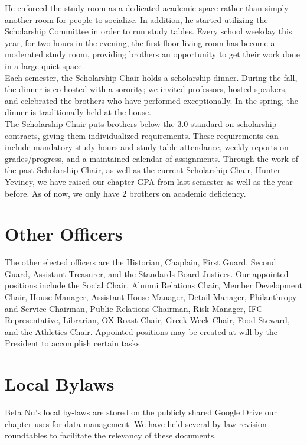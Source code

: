 	He enforced the study room as a dedicated academic space rather than simply another room for people to socialize. In addition, he started utilizing the Scholarship Committee in order to run study tables. Every school weekday this year, for two hours in the evening, the first floor living room has become a moderated study room, providing brothers an opportunity to get their work done in a large quiet space. \\

	Each semester, the Scholarship Chair holds a scholarship dinner. During the fall, the dinner is co-hosted with a sorority; we invited professors, hosted speakers, and celebrated the brothers who have performed exceptionally. In the spring, the dinner is traditionally held at the house. \\

	The Scholarship Chair puts brothers below the 3.0 standard on scholarship contracts, giving them individualized requirements. These requirements can include mandatory study hours and study table attendance, weekly reports on grades/progress, and a maintained calendar of assignments. Through the work of the past Scholarship Chair, as well as the current Scholarship Chair, Hunter Yevincy, we have raised our chapter GPA from last semester as well as the year before. As of now, we only have 2 brothers on academic deficiency. 
	
    \section*{Other Officers}
	The other elected officers are the Historian, Chaplain, First Guard, Second Guard, Assistant Treasurer, and the Standards Board Justices. Our appointed positions include the Social Chair, Alumni Relations Chair, Member Development Chair, House Manager, Assistant House Manager, Detail Manager, Philanthropy and Service Chairman, Public Relations Chairman, Risk Manager, IFC Representative, Librarian, OX Roast Chair, Greek Week Chair, Food Steward, and the Athletics Chair. Appointed positions may be created at will by the President to accomplish certain tasks.
	
    \section*{Local Bylaws}
	Beta Nu's local by-laws are stored on the publicly shared Google Drive our chapter uses for data management. We have held several by-law revision roundtables to facilitate the relevancy of these documents.
	
